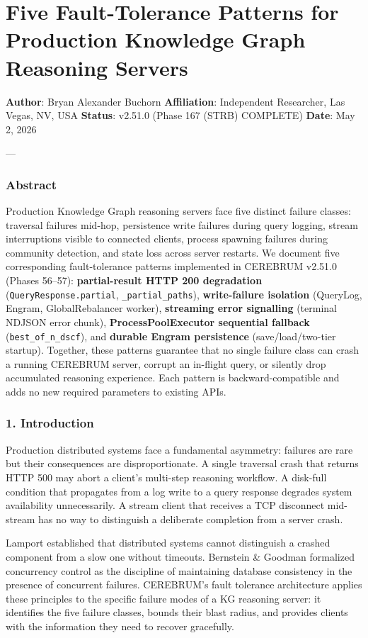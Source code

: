 \section{Five Fault-Tolerance Patterns for Production Knowledge Graph Reasoning Servers}

\textbf{Author}: Bryan Alexander Buchorn  
\textbf{Affiliation}: Independent Researcher, Las Vegas, NV, USA  
\textbf{Status}: v2.51.0 (Phase 167 (STRB) COMPLETE)
\textbf{Date}: May 2, 2026

---

\subsubsection{Abstract}
Production Knowledge Graph reasoning servers face five distinct failure classes: traversal failures mid-hop, persistence write failures during query logging, stream inter\-ruptions visible to connected clients, process spawning failures during community detection, and state loss across server restarts. We document five corre\-sponding fault-tolerance patterns implemented in CEREBRUM v2.51.0 (Phases 56–57): \textbf{partial-result HTTP 200 degradation} (\texttt{QueryResponse.partial}, \texttt{\_partial\_paths}), \textbf{write-failure isolation} (QueryLog, Engram, GlobalRebalancer worker), \textbf{streaming error signalling} (terminal NDJSON error chunk), \textbf{ProcessPoolExecutor sequential fallback} (\texttt{best\_of\_n\_dscf}), and \textbf{durable Engram persistence} (save/load/two-tier startup). Together, these patterns guarantee that no single failure class can crash a running CEREBRUM server, corrupt an in-flight query, or silently drop accumulated reasoning experience. Each pattern is backward-compatible and adds no new required parameters to existing APIs.

\subsubsection{1. Introd\-uction}
Production distributed systems face a fundamental asymmetry: failures are rare but their conse\-quences are dispr\-oportionate. A single traversal crash that returns HTTP 500 may abort a client's multi-step reasoning workflow. A disk-full condition that propagates from a log write to a query response degrades system avail\-ability unnec\-essarily. A stream client that receives a TCP disconnect mid-stream has no way to distinguish a deliberate completion from a server crash.

Lamport \cite{lamport1978} established that distributed systems cannot distinguish a crashed component from a slow one without timeouts. Bernstein \& Goodman \cite{bernstein1983} formalized concurrency control as the discipline of maintaining database consistency in the presence of concurrent failures. CEREBRUM's fault tolerance archi\-tecture applies these principles to the specific failure modes of a KG reasoning server: it identifies the five failure classes, bounds their blast radius, and provides clients with the information they need to recover gracefully.

